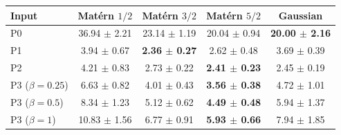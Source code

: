 \begin{tabular}{lcccc}
\toprule
Input & Mat\'ern $1/2$ & Mat\'ern $3/2$ & Mat\'ern $5/2$ & Gaussian \\
\midrule
P0 & 36.94 $\pm$ 2.21 & 23.14 $\pm$ 1.19 & 20.04 $\pm$ 0.94 & \textbf{20.00 $\pm$ 2.16} \\
P1 & 3.94 $\pm$ 0.67 & \textbf{2.36 $\pm$ 0.27} & 2.62 $\pm$ 0.48 & 3.69 $\pm$ 0.39 \\
P2 & 4.21 $\pm$ 0.83 & 2.73 $\pm$ 0.22 & \textbf{2.41 $\pm$ 0.23} & 2.45 $\pm$ 0.19 \\
P3 ($\beta = 0.25$) & 6.63 $\pm$ 0.82 & 4.01 $\pm$ 0.43 & \textbf{3.56 $\pm$ 0.38} & 4.72 $\pm$ 1.01 \\
P3 ($\beta = 0.5$) & 8.34 $\pm$ 1.23 & 5.12 $\pm$ 0.62 & \textbf{4.49 $\pm$ 0.48} & 5.94 $\pm$ 1.37 \\
P3 ($\beta = 1$) & 10.83 $\pm$ 1.56 & 6.77 $\pm$ 0.91 & \textbf{5.93 $\pm$ 0.66} & 7.94 $\pm$ 1.85 \\
\bottomrule
\end{tabular}
